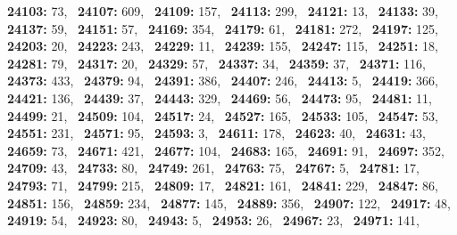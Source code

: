 \textbf{24103:} 73,\allowbreak~ 
\textbf{24107:} 609,\allowbreak~ 
\textbf{24109:} 157,\allowbreak~ 
\textbf{24113:} 299,\allowbreak~ 
\textbf{24121:} 13,\allowbreak~ 
\textbf{24133:} 39,\allowbreak~ 
\textbf{24137:} 59,\allowbreak~ 
\textbf{24151:} 57,\allowbreak~ 
\textbf{24169:} 354,\allowbreak~ 
\textbf{24179:} 61,\allowbreak~ 
\textbf{24181:} 272,\allowbreak~ 
\textbf{24197:} 125,\allowbreak~ 
\textbf{24203:} 20,\allowbreak~ 
\textbf{24223:} 243,\allowbreak~ 
\textbf{24229:} 11,\allowbreak~ 
\textbf{24239:} 155,\allowbreak~ 
\textbf{24247:} 115,\allowbreak~ 
\textbf{24251:} 18,\allowbreak~ 
\textbf{24281:} 79,\allowbreak~ 
\textbf{24317:} 20,\allowbreak~ 
\textbf{24329:} 57,\allowbreak~ 
\textbf{24337:} 34,\allowbreak~ 
\textbf{24359:} 37,\allowbreak~ 
\textbf{24371:} 116,\allowbreak~ 
\textbf{24373:} 433,\allowbreak~ 
\textbf{24379:} 94,\allowbreak~ 
\textbf{24391:} 386,\allowbreak~ 
\textbf{24407:} 246,\allowbreak~ 
\textbf{24413:} 5,\allowbreak~ 
\textbf{24419:} 366,\allowbreak~ 
\textbf{24421:} 136,\allowbreak~ 
\textbf{24439:} 37,\allowbreak~ 
\textbf{24443:} 329,\allowbreak~ 
\textbf{24469:} 56,\allowbreak~ 
\textbf{24473:} 95,\allowbreak~ 
\textbf{24481:} 11,\allowbreak~ 
\textbf{24499:} 21,\allowbreak~ 
\textbf{24509:} 104,\allowbreak~ 
\textbf{24517:} 24,\allowbreak~ 
\textbf{24527:} 165,\allowbreak~ 
\textbf{24533:} 105,\allowbreak~ 
\textbf{24547:} 53,\allowbreak~ 
\textbf{24551:} 231,\allowbreak~ 
\textbf{24571:} 95,\allowbreak~ 
\textbf{24593:} 3,\allowbreak~ 
\textbf{24611:} 178,\allowbreak~ 
\textbf{24623:} 40,\allowbreak~ 
\textbf{24631:} 43,\allowbreak~ 
\textbf{24659:} 73,\allowbreak~ 
\textbf{24671:} 421,\allowbreak~ 
\textbf{24677:} 104,\allowbreak~ 
\textbf{24683:} 165,\allowbreak~ 
\textbf{24691:} 91,\allowbreak~ 
\textbf{24697:} 352,\allowbreak~ 
\textbf{24709:} 43,\allowbreak~ 
\textbf{24733:} 80,\allowbreak~ 
\textbf{24749:} 261,\allowbreak~ 
\textbf{24763:} 75,\allowbreak~ 
\textbf{24767:} 5,\allowbreak~ 
\textbf{24781:} 17,\allowbreak~ 
\textbf{24793:} 71,\allowbreak~ 
\textbf{24799:} 215,\allowbreak~ 
\textbf{24809:} 17,\allowbreak~ 
\textbf{24821:} 161,\allowbreak~ 
\textbf{24841:} 229,\allowbreak~ 
\textbf{24847:} 86,\allowbreak~ 
\textbf{24851:} 156,\allowbreak~ 
\textbf{24859:} 234,\allowbreak~ 
\textbf{24877:} 145,\allowbreak~ 
\textbf{24889:} 356,\allowbreak~ 
\textbf{24907:} 122,\allowbreak~ 
\textbf{24917:} 48,\allowbreak~ 
\textbf{24919:} 54,\allowbreak~ 
\textbf{24923:} 80,\allowbreak~ 
\textbf{24943:} 5,\allowbreak~ 
\textbf{24953:} 26,\allowbreak~ 
\textbf{24967:} 23,\allowbreak~ 
\textbf{24971:} 141,\allowbreak~ 
